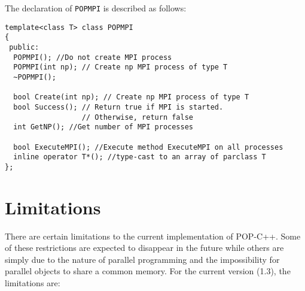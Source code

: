 The declaration of \texttt{POPMPI} is described as follows:

\begin{verbatim} 
template<class T> class POPMPI
{
 public:
  POPMPI(); //Do not create MPI process 
  POPMPI(int np); // Create np MPI process of type T
  ~POPMPI(); 

  bool Create(int np); // Create np MPI process of type T
  bool Success(); // Return true if MPI is started. 
                  // Otherwise, return false
  int GetNP(); //Get number of MPI processes

  bool ExecuteMPI(); //Execute method ExecuteMPI on all processes
  inline operator T*(); //type-cast to an array of parclass T
};
\end{verbatim}


\section{Limitations}


There are certain limitations to the current implementation of POP-C++. 
Some of these restrictions are expected to disappear in the future while others are simply due to the nature of parallel programming and the impossibility for parallel objects to share a common memory. For the current version (1.3), the limitations are:

